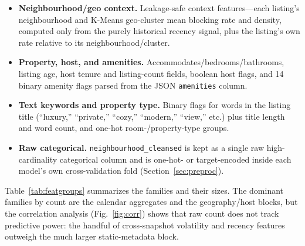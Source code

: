 \documentclass[journal]{IEEEtran}
\begin{document}
\begin{itemize}
\item \textbf{Neighbourhood/geo context.} Leakage-safe context features---each
listing's neighbourhood and K-Means geo-cluster mean blocking rate and
density, computed only from the purely historical recency signal, plus the
listing's own rate relative to its neighbourhood/cluster.
\item \textbf{Property, host, and amenities.} Accommodates/bedrooms/bathrooms,
listing age, host tenure and listing-count fields, boolean host flags, and 14
binary amenity flags parsed from the JSON \texttt{amenities} column.
\item \textbf{Text keywords and property type.} Binary flags for words in the
listing title (``luxury,'' ``private,'' ``cozy,'' ``modern,'' ``view,'' etc.)
plus title length and word count, and one-hot room-/property-type groups.
\item \textbf{Raw categorical.} \texttt{neighbourhood\_cleansed} is kept as a
single raw high-cardinality categorical column and is one-hot- or
target-encoded inside each model's own cross-validation fold
(Section~\ref{sec:preproc}).
\end{itemize}

Table~\ref{tab:featgroups} summarizes the families and their sizes. The
dominant families by count are the calendar aggregates and the geography/host
blocks, but the correlation analysis (Fig.~\ref{fig:corr}) shows that raw count
does not track predictive power: the handful of cross-snapshot volatility and
recency features outweigh the much larger static-metadata block.
\end{document}
